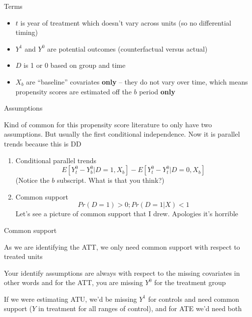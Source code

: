 \documentclass{beamer}
\begin{document}
\begin{frame}{Terms}

\begin{itemize}
\item $t$ is year of treatment which doesn't vary across units (so no differential timing)
\item $Y^1$ and $Y^0$ are potential outcomes (counterfactual versus actual)
\item $D$ is 1 or 0 based on group and time
\item $X_b$ are ``baseline'' covariates \textbf{only} -- they do not vary over time, which means propensity scores are estimated off the $b$ period \textbf{only}
\end{itemize}

\end{frame}

\begin{frame}{Assumptions}

Kind of common for this propensity score literature to only have two assumptions.  But usually the first conditional independence.  Now it is parallel trends because this is DD

\begin{enumerate}
\item Conditional parallel trends $$E[Y^0_t - Y^0_b|D=1,X_b] - E[Y^0_t - Y^0_t | D=0, X_b]$$ (Notice the $b$ subscript.  What is that you think?)
\item Common support $$Pr(D=1)>0; Pr(D=1|X)<1$$ Let's see a picture of common support that I drew.  Apologies it's horrible
\end{enumerate}

\end{frame}

\begin{frame}{Common support}

As we are identifying the ATT, we only need common support with respect to treated units

\bigskip

Your identify assumptions are always with respect to the missing covariates in other words and for the ATT, you are missing $Y^0$ for the treatment group

\bigskip

If we were estimating ATU, we'd be missing $Y^1$ for controls and need common support ($Y$ in treatment for all ranges of control), and for ATE we'd need both

\end{frame}
\end{document}
